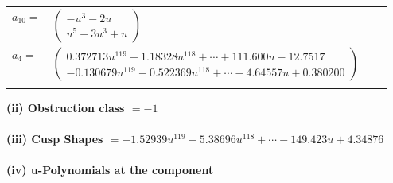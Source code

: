 \documentclass[1p]{elsarticle_modified}
\theoremstyle{definition}
\begin{document}
\begin{tabular}{m{7pt} m{180pt} m{7pt} m{180pt} }
\flushright $a_{10}=$&$\begin{pmatrix}- u^3-2 u\\u^5+3 u^3+u\end{pmatrix}$ \\
\flushright $a_{4}=$&$\begin{pmatrix}0.372713 u^{119}+1.18328 u^{118}+\cdots+111.600 u-12.7517\\-0.130679 u^{119}-0.522369 u^{118}+\cdots-4.64557 u+0.380200\end{pmatrix}$\\&\end{tabular}
\flushleft \textbf{(ii) Obstruction class $= -1$}\\~\\
\flushleft \textbf{(iii) Cusp Shapes $= -1.52939 u^{119}-5.38696 u^{118}+\cdots-149.423 u+4.34876$}\\~\\
\newpage\renewcommand{\arraystretch}{1}
\flushleft \textbf{(iv) u-Polynomials at the component}\newline \\
\end{document}
